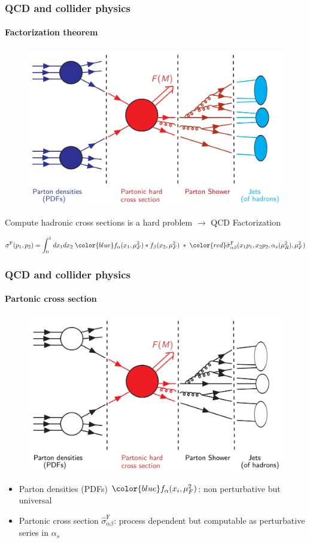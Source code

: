 \documentclass[aspectratio=43]{beamer}
\begin{document}
\begin{frame}

	\frametitle{QCD and collider physics}
	\framesubtitle{Factorization theorem}

	\vspace{0.4 cm}
	
	\begin{figure}
		\includegraphics[width = 7 cm]{plots/part1/chapter2/factorization_1.png}
	\end{figure}
	
	\footnotesize Compute hadronic cross sections is a {\color{red}hard problem} $\longrightarrow$ {\color{blue} QCD Factorization}
	
	\begin{equation}
		\sigma^{\textrm{F}}(p_{1}, p_{2}) =
		\int_{0}^{1} dx_{1} dx_{2} \; {\color{blue} f_{\alpha}(x_{1}, \mu_{F}^{2}) \ast f_{\beta}(x_{2}, \mu_{F}^{2})}
		\; \ast \;  
		{\color{red}\hat{\sigma}^{\textrm{F}}_{\alpha \beta}(x_{1}p_{1}, x_{2}p_{2}, \alpha_{s}(\mu_{R}^{2}), \mu_{F}^{2})} \nonumber
	\end{equation}

\end{frame}

\begin{frame}
	
	\frametitle{QCD and collider physics}
	\framesubtitle{Partonic cross section}
	
	\begin{figure}
		\includegraphics[width = 7 cm]{plots/part1/chapter2/factorization_2.png}
	\end{figure}
	
	\begin{itemize}
		\item \footnotesize Parton densities (PDFs) ${\color{blue} f_{\alpha}(x_{i}, \mu_{F}^{2})}$: non perturbative but universal
		\item \footnotesize Partonic cross section {\color{red}$\hat{\sigma}^{\textrm{F}}_{\alpha \beta}$}: process dependent but computable as perturbative series in $\alpha_{s}$
	\end{itemize}
	
\end{frame}
\end{document}
